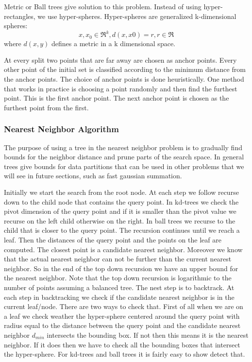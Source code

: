 \documentclass[12pt,letterpaper,doublespaced,ETD,dvips,proposal]{gtthesis}
\begin{document}
\begin{Body}
Metric or Ball trees give solution to this problem. Instead of using
hyper-rectangles, we use hyper-spheres. Hyper-spheres are
generalized k-dimensional spheres:
\begin{equation}
x,x_0 \in \Re^k , d(x,x0)=r, r\in \Re
\end{equation}
where $d(x, y)$ defines a metric in a k dimensional space.

At every split two points that are far away are chosen as anchor
points. Every other point of the initial set is classified according
to the minimum distance from the anchor points. The choice of anchor
points is done heuristically. One method that works in practice is
choosing a point randomly and then find the furthest point. This is
the first anchor point. The next anchor point is chosen as the
furthest point from the first.

\subsubsection{Nearest Neighbor Algorithm}
The purpose of using a tree in the nearest neighbor problem is to
gradually find bounds for the neighbor distance and prune parts of
the search space. In general trees give bounds for data partitions
that can be used in other problems that we will see in future
sections, such as fast gaussian summation.

Initially we start the search from the root node. At each step we
follow recurse down to the child node that contains the query point.
In kd-trees we check the pivot dimension of the query point and if
it is smaller than the pivot value we recurse on the left child
otherwise on the right. In ball trees we recurse to the child that
is closer to the query point. The recursion continues until we reach
a leaf. Then the distances of the query point and the points on the
leaf are computed. The closest point is a candidate nearest
neighbor. Moreover we know that the actual nearest neighbor can not
be further than the current nearest neighbor. So in the end of the
top down recursion we have an upper bound for the nearest neighbor.
Note that the top down recursion is logarithmic to the number of
points assuming a balanced tree. The nest step is to backtrack. At
each step in backtracking we check if the candidate nearest neighbor
is in the current leaf/node. There are two ways to check that. First
of all when we are on a leaf we check weather the hyper-sphere
centered around the query point with radius equal to the distance
 between the query point and the candidate nearest neighbor
 $d_{min}$ intersects the bounding box. If not then this means it is
 the nearest neighbor. If it does then we have to check all the
 bounding boxes that intersect the hyper-sphere. For kd-trees and
 ball trees it is fairly easy to show detect that.


\end{Body}
\end{document}
